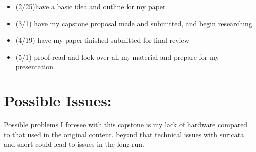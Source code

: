 \documentclass{article}
\begin{document}
\begin{normalsize}
        \begin{itemize}
        
\item(2/25)have a basic idea and outline for my paper
\item (3/1) have my capstone proposal made and submitted, and begin researching
\item(4/19) have my paper finished submitted for final review
\item(5/1) proof read and look over all my material and prepare for my presentation
        \end{itemize}
        
    	\section{Possible Issues:}
        Possible problems I foresee with this capstone is my lack of hardware compared to that used in the original content. beyond that technical issues with suricata and snort could lead to issues in the long run.
\end{normalsize}
  
\end{document}
